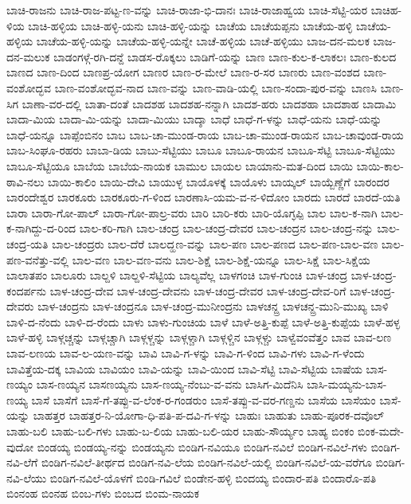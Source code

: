 ಬಾಚಿ-ರಾಜನು
ಬಾಚಿ-ರಾಜ-ಪಟ್ಟ-ಣ-ವನ್ನು
ಬಾಚಿ-ರಾಜಾ-ಭಿ-ದಾನಃ
ಬಾಚಿ-ರಾಜಾಹ್ವಯ
ಬಾಚಿ-ಸೆಟ್ಟಿ-ಯರ
ಬಾಚಿಹ-ಳಿಯ
ಬಾಚಿ-ಹಳ್ಳಿಯ
ಬಾಚಿ-ಹಳ್ಳಿ-ಯನು
ಬಾಚಿ-ಹಳ್ಳಿ-ಯನ್ನು
ಬಾಚೆಯ
ಬಾಚೆಯಪ್ಪನು
ಬಾಚೆಯ-ಹಳ್ಳಿ
ಬಾಚೆಯ-ಹಳ್ಳಿಯ
ಬಾಚೆಯ-ಹಳ್ಳಿ-ಯನ್ನು
ಬಾಚೆಯ-ಹಳ್ಳಿ-ಯನ್ನೇ
ಬಾಚೆ-ಹಳ್ಳಿಯ
ಬಾಚೆ-ಹಳ್ಳಿಯು
ಬಾಜ-ದನ-ಮಲಕ
ಬಾಜ-ದನ-ಮಲುಕ
ಬಾಡಂಗಳ್ಗೆ-ರಗಿ-ದನ್ದೆ
ಬಾಡಸ-ರೊಕ್ಕಲು
ಬಾಡಿಗೆ-ಯನ್ನು
ಬಾಣ
ಬಾಣ-ಕುಲ-ಕ-ಲಾಕಲಃ
ಬಾಣ-ಕುಲದ
ಬಾಣದ
ಬಾಣ-ದಿಂದ
ಬಾಣಪ್ರ-ಯೋಗ
ಬಾಣರ
ಬಾಣ-ರ-ಮೇಲೆ
ಬಾಣ-ರ-ಸರ
ಬಾಣರು
ಬಾಣ-ವಂಶದ
ಬಾಣ-ವಂಶೋದ್ಭವ
ಬಾಣ-ವಂಶೋದ್ಭವ-ನಾದ
ಬಾಣ-ವನ್ನು
ಬಾಣ-ವಾಡಿ-ಯಲ್ಲಿ
ಬಾಣ-ಸಂದಾ-ಪುರ-ವನ್ನು
ಬಾಣಸಿ
ಬಾಣ-ಸಿಗ
ಬಾಣಾ-ವರ-ದಲ್ಲಿ
ಬಾತಾ-ದಂತೆ
ಬಾದಶಹ
ಬಾದಶಹ-ನನ್ನಾಗಿ
ಬಾದಶ-ಹರು
ಬಾದಶಹಾ
ಬಾದಶಾಹ
ಬಾದಾಮಿ
ಬಾದಾ-ಮಿಯ
ಬಾದಾ-ಮಿ-ಯನ್ನು
ಬಾದಾ-ಮಿಯು
ಬಾದ್ಶಾ
ಬಾಧೆ
ಬಾಧೆ-ಗ-ಳನ್ನು
ಬಾಧೆ-ಯನು
ಬಾಧೆ-ಯನ್ನು
ಬಾಧೆ-ಯನ್ನೂ
ಬಾಪ್ಪೆಂಬಿನಂ
ಬಾಬ
ಬಾಬ-ಚಾ-ಮುಂಡ-ರಾಯ
ಬಾಬ-ಚಾ-ಮುಂಡ-ರಾಯನ
ಬಾಬ-ಚಾವುಂಡ-ರಾಯ
ಬಾಬ-ಸಿಂಘೂ-ರಹರು
ಬಾಬಾ-ಡಿಯ
ಬಾಬು-ಸೆಟ್ಟಿಯು
ಬಾಬೂ
ಬಾಬೂ-ರಾಯನ
ಬಾಬೂ-ಸೆಟ್ಟಿ
ಬಾಬೂ-ಸೆಟ್ಟಿಯು
ಬಾಬೂ-ಸೆಟ್ಟಿಯೂ
ಬಾಬೆಯ
ಬಾಬೆಯ-ನಾಯಕ
ಬಾಮುಲ
ಬಾಯಲ
ಬಾಯಾನು-ಮತ-ದಿಂದ
ಬಾಯಿ
ಬಾಯಿ-ಕಾಲ-ಠಾವಿ-ನಲು
ಬಾಯಿ-ಕಾಲಿಂ
ಬಾಯಿ-ದೇವಿ
ಬಾಯುಳ್ಳ
ಬಾಯೊಳಕ್ಕೆ
ಬಾಯೊಳು
ಬಾಯ್ಕಲ್
ಬಾಯ್ಬೆಣ್ಣೆಗೆ
ಬಾರಂದರ
ಬಾರಂದೇಶ್ವರ
ಬಾರಕೂರು
ಬಾರಕೂರು-ಗ-ಳಿಂದ
ಬಾರಣಾಸಿ-ಯಮ-ವ-ನ-ಳಿದೋಂ
ಬಾರದು
ಬಾರದೆ
ಬಾರದೆ-ಯತಿ
ಬಾರಾ
ಬಾರಾ-ಗೋ-ಪಾಲ್
ಬಾರಾ-ಗೋ-ಪಾಲ್ರ-ವರು
ಬಾರಿ
ಬಾರಿ-ಕರು
ಬಾರಿ-ಯೊಗ್ಳಪ್ಪಿ
ಬಾಲ
ಬಾಲ-ಕ-ನಾಗಿ
ಬಾಲ-ಕ-ನಾಗಿದ್ದು-ದ-ರಿಂದ
ಬಾಲ-ಕರಿ-ಗಾಗಿ
ಬಾಲ-ಚಂದ್ರ
ಬಾಲ-ಚಂದ್ರ-ದೇವರ
ಬಾಲ-ಚಂದ್ರನ
ಬಾಲ-ಚಂದ್ರ-ನನ್ನು
ಬಾಲ-ಚಂದ್ರ-ಯತಿ
ಬಾಲ-ಚಂದ್ರರು
ಬಾಲ-ದೆರೆ
ಬಾಲದ್ಹಣ-ವನ್ನು
ಬಾಲ-ಪಣ
ಬಾಲ-ಪಣದ
ಬಾಲ-ಪಣ-ಬಾಲ-ವಣ
ಬಾಲ-ಪಣ-ವನೆತ್ತು-ವಲ್ಲಿ
ಬಾಲ-ವಣ
ಬಾಲ-ವಣ-ವನು
ಬಾಲ-ಶಿಕ್ಷೆ
ಬಾಲ-ಶಿಕ್ಷೆ-ಯನ್ನೂ
ಬಾಲ-ಸಿಕ್ಷೆ
ಬಾಲ-ಸಿಕ್ಷೆಯ
ಬಾಲಾತಪಂ
ಬಾಲೂರು
ಬಾಲ್ದಳಿ
ಬಾಲ್ದಳಿ-ಸೆಟ್ಟಿಯ
ಬಾಲ್ಯವೆಲ್ಲ
ಬಾಳಗಂಚಿ
ಬಾಳ-ಗುಂಚಿ
ಬಾಳ-ಚಂದ್ರ
ಬಾಳ-ಚಂದ್ರ-ಕಂದರ್ಪನು
ಬಾಳ-ಚಂದ್ರ-ದೇವ
ಬಾಳ-ಚಂದ್ರ-ದೇವನು
ಬಾಳ-ಚಂದ್ರ-ದೇವರ
ಬಾಳ-ಚಂದ್ರ-ದೇವ-ರಿಗೆ
ಬಾಳ-ಚಂದ್ರ-ದೇವರು
ಬಾಳ-ಚಂದ್ರನು
ಬಾಳ-ಚಂದ್ರನೂ
ಬಾಳ-ಚಂದ್ರ-ಮುನೀಂದ್ರನು
ಬಾಳಚನ್ದ್ರ
ಬಾಳಚನ್ದ್ರ-ಮುನಿ-ಮುಖ್ಯ
ಬಾಳಿ
ಬಾಳಿ-ದ-ನೆಂದು
ಬಾಳಿ-ದ-ರೆಂದು
ಬಾಳು
ಬಾಳು-ಗುಂಚಿಯ
ಬಾಳೆ
ಬಾಳೆ-ಅತ್ತಿ-ಕುಪ್ಪೆ
ಬಾಳೆ-ಅತ್ತಿ-ಕುಪ್ಪೆಯ
ಬಾಳೆ-ಹಳ್ಳ
ಬಾಳೆ-ಹಳ್ಳಿ
ಬಾಳ್ಗಚ್ಚನ್ನು
ಬಾಳ್ಗಚ್ಚಾಗಿ
ಬಾಳ್ಗಳ್ಚನ್ನು
ಬಾಳ್ಗಳ್ಚಾಗಿ
ಬಾಳ್ಗಳ್ಚಿನ
ಬಾಳ್ಗಳ್ಚು
ಬಾಳ್ವೆವಂವೆತ್ತಂ
ಬಾವ
ಬಾವ-ಲಣ
ಬಾವ-ಲಣಯ
ಬಾವ-ಲ-ಯಣ-ವನ್ನು
ಬಾವಿ
ಬಾವಿ-ಗ-ಳನ್ನು
ಬಾವಿ-ಗ-ಳಿಂದ
ಬಾವಿ-ಗಳು
ಬಾವಿ-ಗ-ಳೆಂದು
ಬಾವಿತ್ತೆಯ-ದಕ್ಕ
ಬಾವಿಯ
ಬಾವಿಯಂ
ಬಾವಿ-ಯನ್ನು
ಬಾವಿ-ಯಿಂದ
ಬಾವಿ-ಸೆಟ್ಟಿ
ಬಾವಿ-ಸೆಟ್ಟಿಯ
ಬಾಷೆಯ
ಬಾಸ-ಣಯ್ಯಂ
ಬಾಸ-ಣಯ್ಯನ
ಬಾಸಣಯ್ಯನು
ಬಾಸ-ಣಯ್ಯ-ನೆಂಬು-ವ-ವನು
ಬಾಸಿಗ-ಮಿದೆನಿಸಿ
ಬಾಸಿ-ಮಯ್ಯನು-ಬಾಸ-ಣಯ್ಯ
ಬಾಸೆ
ಬಾಸೆಗೆ
ಬಾಸೆ-ಗೆ-ತಪ್ಪು-ವ-ಲೆಂಕ-ರ-ಗಂಡರುಂ
ಬಾಸೆ-ತಪ್ಪು-ವ-ವರ-ಗಣ್ಡನು
ಬಾಸೆಯ
ಬಾಸೆಯಂ
ಬಾಸೆ-ಯನ್ನು
ಬಾಹತ್ತರ
ಬಾಹತ್ತರ-ನಿ-ಯೋಗಾ-ಧಿ-ಪತಿ-ಪ-ದವಿ-ಗ-ಳನ್ನು
ಬಾಹುಃ
ಬಾಹುತು
ಬಾಹು-ಪೂರಕ-ದವೊಲ್
ಬಾಹು-ಬಲಿ
ಬಾಹು-ಬಲಿ-ಗಳು
ಬಾಹು-ಬ-ಲಿಯ
ಬಾಹು-ಬಲಿ-ಯರ
ಬಾಹು-ಸೌರ್ಯ್ಯಂ
ಬಾಹ್ಯ
ಬಿಂಕಂ
ಬಿಂಕ-ಮದೇ-ವುದೋ
ಬಿಂಡಯ್ಯ
ಬಿಂಡಯ್ಯ-ನನ್ನು
ಬಿಂಡಯ್ಯನು
ಬಿಂಡಿಗ-ನವಿಯೂ
ಬಿಂಡಿಗ-ನವಿಲೆ
ಬಿಂಡಿಗ-ನವಿಲೆ-ಗಳು
ಬಿಂಡಿಗ-ನವಿ-ಲೆಗೆ
ಬಿಂಡಿಗ-ನವಿಲೆ-ತೀರ್ಥದ
ಬಿಂಡಿಗ-ನವಿ-ಲೆಯ
ಬಿಂಡಿಗ-ನವಿಲೆ-ಯಲ್ಲಿ
ಬಿಂಡಿಗ-ನವಿಲೆ-ಯ-ವರೆಗೂ
ಬಿಂಡಿಗ-ನವಿ-ಲೆಯು
ಬಿಂಡಿಗ-ನವಿಲೆ-ಯೊಳಗೆ
ಬಿಂಡಿ-ಗವಿಲೆ
ಬಿಂಡೇನ-ಹಳ್ಳಿ
ಬಿಂದಯ್ಯ
ಬಿಂದಾರ-ಪತಿ
ಬಿಂದಾರೊ-ಪತಿ
ಬಿಂನಂಹ
ಬಿಂನಹ
ಬಿಂಬ-ಗಳು
ಬಿಂಬದ
ಬಿಂಮ-ನಾಯಕ
